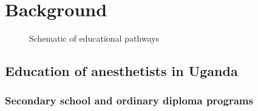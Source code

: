 \documentclass[12pt]{article} %
\begin{document}

\section{Background} %



\begin{figure}[H] %
\caption{Schematic of educational pathways}
\label{fig:edupathways}
\end{figure}


\subsection{Education of anesthetists in Uganda} %

\subsubsection{Secondary school and ordinary diploma programs}
\end{document}
